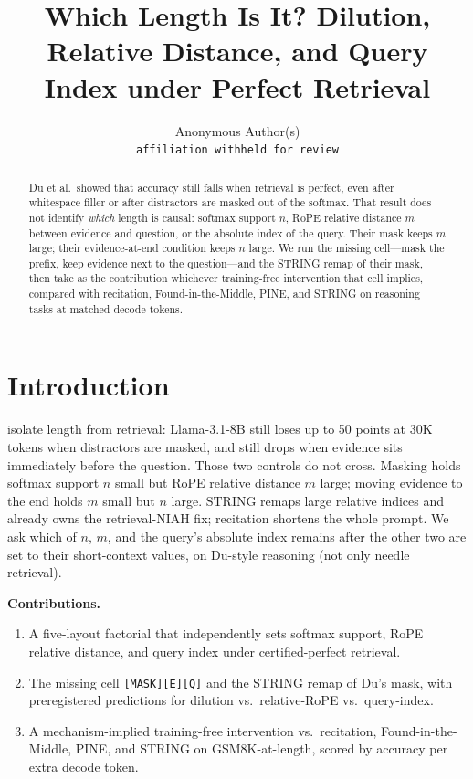 \documentclass[11pt]{article}
\title{Which Length Is It? Dilution, Relative Distance, and Query Index under Perfect Retrieval}
\author{
  Anonymous Author(s) \\
  \texttt{affiliation withheld for review} \\
}
\begin{document}
\maketitle

\begin{abstract}
Du et al.\ showed that accuracy still falls when retrieval is perfect, even after whitespace filler or after distractors are masked out of the softmax. That result does not identify \emph{which} length is causal: softmax support $n$, RoPE relative distance $m$ between evidence and question, or the absolute index of the query. Their mask keeps $m$ large; their evidence-at-end condition keeps $n$ large. We run the missing cell---mask the prefix, keep evidence next to the question---and the STRING remap of their mask, then take as the contribution whichever training-free intervention that cell implies, compared with recitation, Found-in-the-Middle, PINE, and STRING on reasoning tasks at matched decode tokens.
\end{abstract}


\section{Introduction}
\label{sec:intro}
\citet{contextlength2025} isolate length from retrieval: Llama-3.1-8B still loses up to 50 points at 30K tokens when distractors are masked, and still drops when evidence sits immediately before the question. Those two controls do not cross. Masking holds softmax support $n$ small but RoPE relative distance $m$ large; moving evidence to the end holds $m$ small but $n$ large. STRING \citep{string2025} remaps large relative indices and already owns the retrieval-NIAH fix; recitation \citep{contextlength2025} shortens the whole prompt. We ask which of $n$, $m$, and the query's absolute index remains after the other two are set to their short-context values, on Du-style reasoning (not only needle retrieval).

\textbf{Contributions.}
\begin{enumerate}
    \item A five-layout factorial that independently sets softmax support, RoPE relative distance, and query index under certified-perfect retrieval.
    \item The missing cell \texttt{[MASK][E][Q]} and the STRING remap of Du's mask, with preregistered predictions for dilution vs.\ relative-RoPE vs.\ query-index.
    \item A mechanism-implied training-free intervention vs.\ recitation, Found-in-the-Middle, PINE, and STRING on GSM8K-at-length, scored by accuracy per extra decode token.
\end{enumerate}
\end{document}
